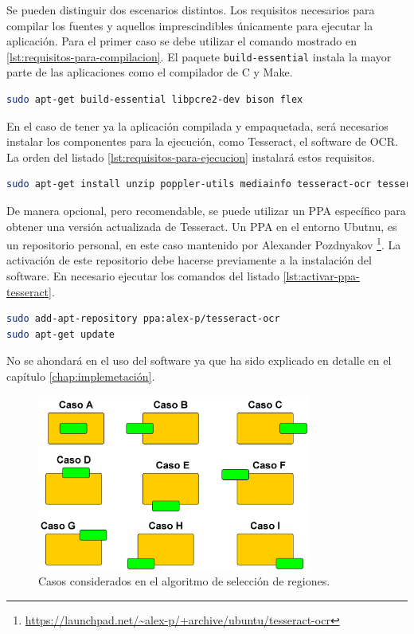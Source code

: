 Se pueden distinguir dos escenarios distintos. Los requisitos necesarios para compilar los fuentes y aquellos imprescindibles únicamente para ejecutar la aplicación. Para el primer caso se debe utilizar el comando mostrado en \ref{lst:requisitos-para-compilacion}. El paquete \verb|build-essential| instala la mayor parte de las aplicaciones como el compilador de C y Make.

\begin{lstlisting}[language=bash,caption={Dependencias para la compilación.},label=lst:requisitos-para-compilacion]
sudo apt-get build-essential libpcre2-dev bison flex
\end{lstlisting}

En el caso de tener ya la aplicación compilada y empaquetada, será necesarios instalar los componentes para la ejecución, como Tesseract, el software de OCR. La orden del listado \ref{lst:requisitos-para-ejecucion} instalará estos requisitos.

\begin{lstlisting}[language=bash,caption={Dependencias para la ejecución.},label=lst:requisitos-para-ejecucion]
sudo apt-get install unzip poppler-utils mediainfo tesseract-ocr tesseract-ocr-spa jq python3-opencv jq bc
\end{lstlisting}

De manera opcional, pero recomendable, se puede utilizar un PPA específico para obtener una versión actualizada de Tesseract. Un PPA en el entorno Ubutnu, es un repositorio personal, en este caso mantenido por Alexander Pozdnyakov \footnote{\url{https://launchpad.net/~alex-p/+archive/ubuntu/tesseract-ocr}}. La activación de este repositorio debe hacerse previamente a la instalación del software. En necesario ejecutar los comandos del listado \ref{lst:activar-ppa-tesseract}.

\begin{lstlisting}[language=bash,caption={Activar PPA de Tesseract.},label=lst:activar-ppa-tesseract]
sudo add-apt-repository ppa:alex-p/tesseract-ocr
sudo apt-get update
\end{lstlisting}

No se ahondará en el uso del software ya que ha sido explicado en detalle en el capítulo \ref{chap:implemetación}.

\begin{figure}[hp!]
    \centering
    \includegraphics[width=0.8\textwidth]{imaxes/z-adicional/casos-algoritmo-seleccion-regiones.png}
    \caption{Casos considerados en el algoritmo de selección de regiones.}
    \label{fig:casos-algoritmo-seleccion-regiones}
\end{figure}